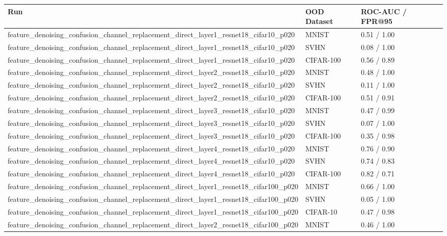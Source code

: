 \begin{tabular}{lll}
\toprule
Run & OOD Dataset & ROC-AUC / FPR@95 \\
\midrule
feature\_denoising\_confusion\_channel\_replacement\_direct\_layer1\_resnet18\_cifar10\_p020 & MNIST & 0.51 / 1.00 \\
feature\_denoising\_confusion\_channel\_replacement\_direct\_layer1\_resnet18\_cifar10\_p020 & SVHN & 0.08 / 1.00 \\
feature\_denoising\_confusion\_channel\_replacement\_direct\_layer1\_resnet18\_cifar10\_p020 & CIFAR-100 & 0.56 / 0.89 \\
feature\_denoising\_confusion\_channel\_replacement\_direct\_layer2\_resnet18\_cifar10\_p020 & MNIST & 0.48 / 1.00 \\
feature\_denoising\_confusion\_channel\_replacement\_direct\_layer2\_resnet18\_cifar10\_p020 & SVHN & 0.11 / 1.00 \\
feature\_denoising\_confusion\_channel\_replacement\_direct\_layer2\_resnet18\_cifar10\_p020 & CIFAR-100 & 0.51 / 0.91 \\
feature\_denoising\_confusion\_channel\_replacement\_direct\_layer3\_resnet18\_cifar10\_p020 & MNIST & 0.47 / 0.99 \\
feature\_denoising\_confusion\_channel\_replacement\_direct\_layer3\_resnet18\_cifar10\_p020 & SVHN & 0.07 / 1.00 \\
feature\_denoising\_confusion\_channel\_replacement\_direct\_layer3\_resnet18\_cifar10\_p020 & CIFAR-100 & 0.35 / 0.98 \\
feature\_denoising\_confusion\_channel\_replacement\_direct\_layer4\_resnet18\_cifar10\_p020 & MNIST & 0.76 / 0.90 \\
feature\_denoising\_confusion\_channel\_replacement\_direct\_layer4\_resnet18\_cifar10\_p020 & SVHN & 0.74 / 0.83 \\
feature\_denoising\_confusion\_channel\_replacement\_direct\_layer4\_resnet18\_cifar10\_p020 & CIFAR-100 & 0.82 / 0.71 \\
feature\_denoising\_confusion\_channel\_replacement\_direct\_layer1\_resnet18\_cifar100\_p020 & MNIST & 0.66 / 1.00 \\
feature\_denoising\_confusion\_channel\_replacement\_direct\_layer1\_resnet18\_cifar100\_p020 & SVHN & 0.05 / 1.00 \\
feature\_denoising\_confusion\_channel\_replacement\_direct\_layer1\_resnet18\_cifar100\_p020 & CIFAR-10 & 0.47 / 0.98 \\
feature\_denoising\_confusion\_channel\_replacement\_direct\_layer2\_resnet18\_cifar100\_p020 & MNIST & 0.46 / 1.00 \\

\end{tabular}
